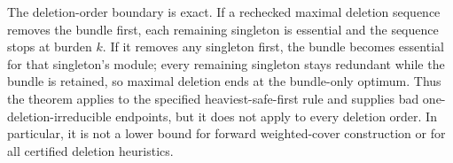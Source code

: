 The deletion-order boundary is exact.  If a rechecked maximal deletion
sequence removes the bundle first, each remaining singleton is essential and
the sequence stops at burden \(k\).  If it removes any singleton first, the
bundle becomes essential for that singleton's module; every remaining
singleton stays redundant while the bundle is retained, so maximal deletion
ends at the bundle-only optimum.  Thus the theorem applies to the specified
heaviest-safe-first rule and supplies bad one-deletion-irreducible endpoints,
but it does not apply to every deletion order.  In particular, it is not a
lower bound for forward weighted-cover construction or for all certified
deletion heuristics.
